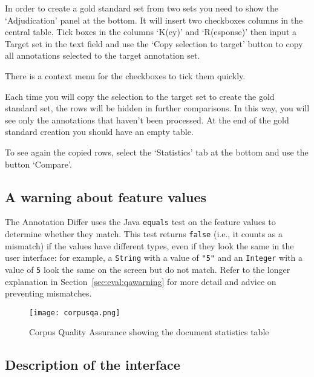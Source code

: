 In order to create a gold standard set from two sets you need to show the
`Adjudication' panel at the bottom. It will insert two checkboxes columns in
the central table. Tick boxes in the columns `K(ey)' and `R(esponse)' then
input a Target set in the text field and use the `Copy selection to target'
button to copy all annotations selected to the target annotation set.

There is a context menu for the checkboxes to tick them quickly.

Each time you will copy the selection to the target set to create the gold
standard set, the rows will be hidden in further comparisons. In this way,
you will see only the annotations that haven't been processed. At the end of
the gold standard creation you should have an empty table.

To see again the copied rows, select the `Statistics' tab at the bottom and
use the button `Compare'.

\subsection[sec:eval:adwarning]{A warning about feature values}
%
The Annotation Differ uses the Java \texttt{equals} test on the feature values
to determine whether they match.  This test returns \texttt{false} (i.e., it
counts as a mismatch) if the values have different types, even if they look the
same in the user interface: for example, a \texttt{String} with a value of
\texttt{"5"} and an \texttt{Integer} with a value of \texttt{5} look the same on
the screen but do not match.  Refer to the longer explanation in
Section~\ref{sec:eval:qawarning} for more detail and advice on preventing
mismatches.
%

\begin{figure}[htbp]
\begin{center}
\texttt{[image: corpusqa.png]}
\end{center}
\caption{Corpus Quality Assurance showing the document statistics table}
\label{fig:corpusqa}
\end{figure}

\subsection{Description of the interface}


